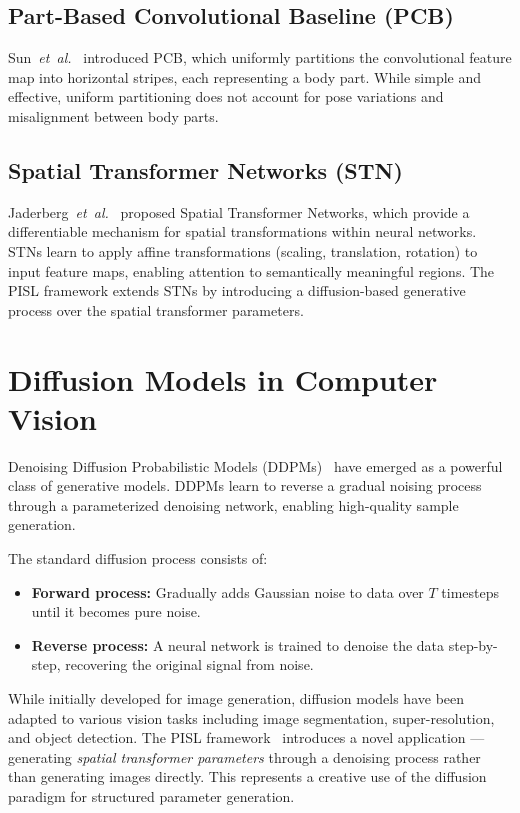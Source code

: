 \subsection{Part-Based Convolutional Baseline (PCB)}

Sun~\textit{et~al.}~\cite{sun2018beyond} introduced PCB, which uniformly partitions the convolutional feature map into horizontal stripes, each representing a body part. While simple and effective, uniform partitioning does not account for pose variations and misalignment between body parts.

\subsection{Spatial Transformer Networks (STN)}

Jaderberg~\textit{et~al.}~\cite{jaderberg2015spatial} proposed Spatial Transformer Networks, which provide a differentiable mechanism for spatial transformations within neural networks. STNs learn to apply affine transformations (scaling, translation, rotation) to input feature maps, enabling attention to semantically meaningful regions. The PISL framework extends STNs by introducing a diffusion-based generative process over the spatial transformer parameters.

\section{Diffusion Models in Computer Vision}

Denoising Diffusion Probabilistic Models (DDPMs)~\cite{ho2020denoising} have emerged as a powerful class of generative models. DDPMs learn to reverse a gradual noising process through a parameterized denoising network, enabling high-quality sample generation.

The standard diffusion process consists of:
\begin{itemize}
    \item \textbf{Forward process:} Gradually adds Gaussian noise to data over $T$ timesteps until it becomes pure noise.
    \item \textbf{Reverse process:} A neural network is trained to denoise the data step-by-step, recovering the original signal from noise.
\end{itemize}

While initially developed for image generation, diffusion models have been adapted to various vision tasks including image segmentation, super-resolution, and object detection. The PISL framework~\cite{tao2024unsupervised} introduces a novel application --- generating \textit{spatial transformer parameters} through a denoising process rather than generating images directly. This represents a creative use of the diffusion paradigm for structured parameter generation.

